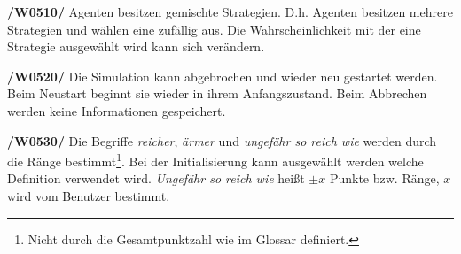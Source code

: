 \textbf{/W0510/}
Agenten besitzen gemischte Strategien. D.h. Agenten besitzen mehrere Strategien und wählen eine zufällig aus. Die Wahrscheinlichkeit mit der eine Strategie ausgewählt wird kann sich verändern.

\textbf{/W0520/}
Die Simulation kann abgebrochen und wieder neu gestartet werden. Beim Neustart beginnt sie wieder in ihrem Anfangszustand. Beim Abbrechen werden keine Informationen gespeichert.

\textbf{/W0530/}
Die Begriffe \emph{reicher}, \emph{ärmer} und \emph{ungefähr so reich wie} werden durch die Ränge bestimmt\footnote{Nicht durch die Gesamtpunktzahl wie im Glossar definiert.}. Bei der Initialisierung kann ausgewählt werden welche Definition verwendet wird. \emph{Ungefähr so reich wie} heißt $\pm x$ Punkte bzw. Ränge, $x$ wird vom Benutzer bestimmt.
